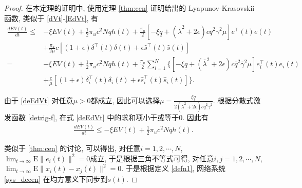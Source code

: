         \begin{proof}
        在本定理的证明中, 使用定理 \eqref{thm:cen} 证明给出的 Lyapunov-Krasovskii 函数, 类似于 \eqref{dVt}-\eqref{EdVt}, 有
        \begin{align}\label{deEdVt}
        \nonumber \frac{dEV(t)}{dt}\leq&-\xi EV(t)+\frac{1}{2}\pi_uc^2Nqh(t)+\frac{\pi_u}{2}[-\xi\underline{q}+(\bar{\lambda}^2
        +2\epsilon)c\bar{q}^2\bar{\gamma}^2\mu]e^\top(t)e(t)\\
        \nonumber&+\frac{\pi_u}{2\mu}c[(1+\epsilon)\delta^\top(t)\delta(t)+\epsilon\hat{s}^\top(t)\hat{s}(t)]\\
        \nonumber=&-\xi EV(t)+\frac{1}{2}\pi_uc^2Nqh(t)+\frac{\pi_u}{2}\sum_{i=1}^N\bigg\{[-\xi\underline{q}+(\bar{\lambda}^2
        +2\epsilon)c\bar{q}^2\bar{\gamma}^2\mu]e_i^\top(t)e_i(t)\\
        &+\frac{c}{\mu}[(1+\epsilon)\delta_i^\top(t)\delta_i(t)+\epsilon\hat{s}_i^\top(t)\hat{s}_i(t)]\bigg\}.
        \end{align}

        由于 \eqref{deEdVt} 对任意$\mu>0$都成立, 因此可以选择$\mu=\frac{\xi\underline{q}}{2(\bar{\lambda}^2+2\epsilon)c\bar{q}^2\bar{\gamma}^2}$. 根据分散式激发函数 \eqref{detrig-f}, 在式 \eqref{deEdVt} 中的求和项小于或等于$0$. 因此有
        \begin{align*}
            \frac{dEV(t)}{dt}\leq-\xi EV(t)+\frac{1}{2}\pi_uc^2Nqh(t).
        \end{align*}

        类似于 \eqref{thm:cen} 的讨论, 可以得出, 对任意$i=1,2,\cdots,N$, $\lim_{t\rightarrow\infty}\mathrm{E}\|e_i(t)\|^2=0$成立, 于是根据三角不等式可得, 对任意$i, j=1,2,\cdots,N$, $\lim_{t\rightarrow\infty}\mathrm{E}\|x_i(t)-x_j(t)\|^2=0$. 于是根据定义 \eqref{defn1}, 网络系统 \eqref{sys_decen} 在均方意义下同步到$s(t)$.
        \end{proof}

